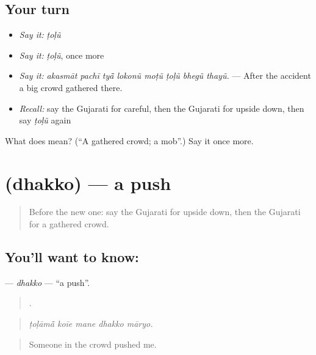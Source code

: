 \subsection*{Your turn}
\begin{itemize}
\raggedright
  \item \emph{Say it:} \emph{ṭoḷũ}
  \item \emph{Say it:} \emph{ṭoḷũ}, once more
  \item \emph{Say it:} \emph{akasmāt pachī tyā̃ lokonũ moṭũ ṭoḷũ bhegũ thayũ.} — After the accident a big crowd gathered there.
  \item \emph{Recall:} say the Gujarati for careful, then the Gujarati for upside down, then say \emph{ṭoḷũ} again
\end{itemize}

\begin{tcolorbox}[breakable,colback=teal!4,colframe=teal!35!black,title={Before you move on}]
What does  mean? (\textquotedblleft{}A gathered crowd; a mob\textquotedblright{}.) Say it once more.
\end{tcolorbox}
\section[\texorpdfstring{\gu{ધક્કો} (dhakko)}{ધક્કો (dhakko)}]{ (dhakko) — a push}

\label{lesson:GU-C297-dhakko}



\begin{quote}
Before the new one: say the Gujarati for upside down, then the Gujarati for a gathered crowd.
\end{quote}

\subsection*{You'll want to know: }
\textbf{} — \emph{dhakko} — \textquotedblleft{}a push\textquotedblright{}.

\begin{quote}
    .
\end{quote}

\begin{quote}
\emph{ṭoḷāmā̃ koīe mane dhakko māryo.}
\end{quote}

\begin{quote}
Someone in the crowd pushed me.
\end{quote}

